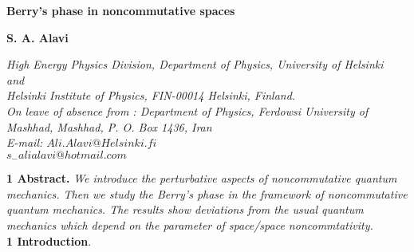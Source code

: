 \documentclass[a4paper,a4paper]{article}
\begin{document}
\begin{center}
{\LARGE \bf Berry's phase in noncommutative  spaces }
\end{center}
\vspace{2.cm}
\begin{center}
{\LARGE\bf S. A. Alavi}
\end{center}
\begin{center}
\textit{High Energy Physics Division, Department of Physics,
University of
Helsinki\\
and\\
Helsinki Institute of Physics, FIN-00014 Helsinki, Finland.\\
On leave of absence from : Department of Physics, Ferdowsi
University of
Mashhad, Mashhad, P. O. Box 1436, Iran\\
E-mail: $Ali.Alavi@Helsinki.fi$\\
$s_{-}alialavi@hotmail.com$}
\end{center}

\textbf{1 Abstract.} \textsl{We introduce the perturbative aspects
of noncommutative quantum mechanics. Then we study the Berry's
phase in the framework of noncommutative quantum mechanics.
The results show deviations from the usual quantum mechanics which depend on
the parameter of space/space noncommtativity.}\\



\textbf{1 Introduction}.\\
\end{document}
